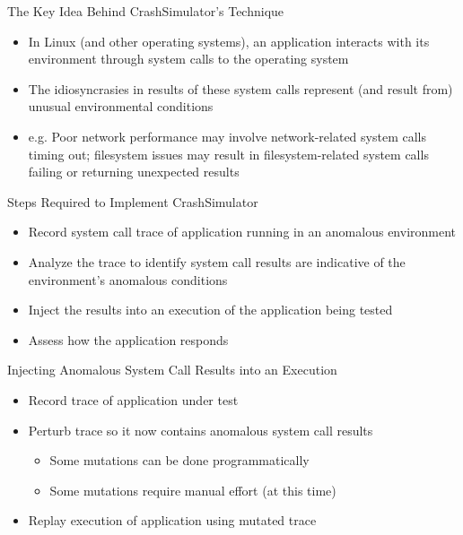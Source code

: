\documentclass[pdf]{beamer}
\begin{document}
\begin{frame}{The Key Idea Behind CrashSimulator's Technique}
  \begin{itemize}
  \item{In Linux (and other operating systems), an application interacts with its environment
      through system calls to the operating system}
  \item{The idiosyncrasies in results of these system calls represent (and
      result from) unusual environmental conditions}
  \item{e.g. Poor network performance may involve network-related system
      calls timing out; filesystem issues may result in filesystem-related system
      calls failing or returning unexpected results}
  \end{itemize}
\end{frame}


\begin{frame}{Steps Required to Implement CrashSimulator}
  \begin{itemize}
  \item{Record system call trace of application running in an anomalous
      environment}
  \item{Analyze the trace to identify system call results are
      indicative of the environment's anomalous conditions}
  \item{Inject the results into an execution of the application being tested}
  \item{Assess how the application responds}
  \end{itemize}
\end{frame}


\begin{frame}{Injecting Anomalous System Call Results into an Execution}
  \begin{itemize}
  \item{Record trace of application under test}
  \item{Perturb trace so it now contains anomalous system call results}
    \begin{itemize}
    \item{Some mutations can be done programmatically}
    \item{Some mutations require manual effort (at this time)}
    \end{itemize}
  \item{Replay execution of application using mutated trace}
  \end{itemize}
\end{frame}
\end{document}
